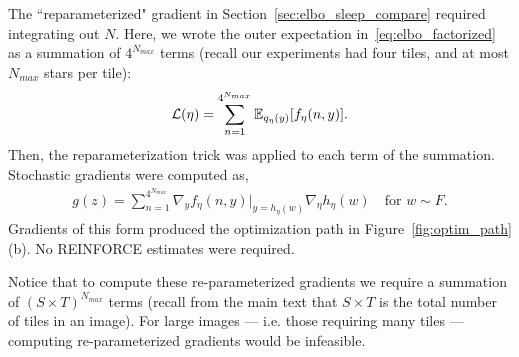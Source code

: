 The ``reparameterized" gradient in Section~\ref{sec:elbo_sleep_compare} required integrating out $N$.
Here, we wrote the outer expectation in~\eqref{eq:elbo_factorized} as a summation of $4^{N_{max}}$ terms (recall our experiments had four tiles, and at most $N_{max}$ stars per tile):
\begin{align}
\mathcal{L}(\eta) = \sum_{n=1}^{4^{N_{max}}}\mathbb{E}_{q_\eta(y)}[f_\eta(n, y)].
\end{align}
Then, the reparameterization trick was applied to each term of the summation.
Stochastic gradients were computed as,
\begin{align}
g(z) = \sum_{n=1}^{4^{N_{max}}}\nabla_y f_\eta(n, y)\Big|_{y = h_\eta(w)}
\nabla_\eta h_\eta(w) \quad \text{for } w\sim F.
\end{align}
Gradients of this form produced the optimization path in Figure~\ref{fig:optim_path}(b).
No REINFORCE estimates were required. 

Notice that to compute these re-parameterized gradients we require 
a summation of $(S \times T)^{N_{max}}$ terms 
(recall from the main text that $S \times T$ is the total number 
of tiles in an image). 
For large images --- i.e. those requiring many tiles --- 
computing re-parameterized gradients would be infeasible. 

